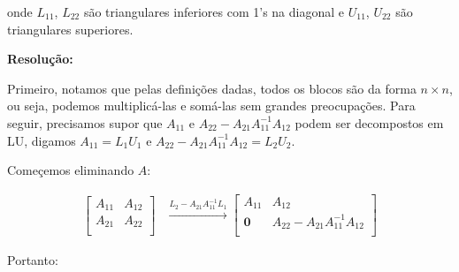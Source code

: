 \documentclass[leqno]{article}
\begin{document}
\begin{enumerate}
    onde $L_{11}$, $L_{22}$ são triangulares inferiores com 1's na diagonal e $U_{11}$, $U_{22}$ são triangulares superiores.
    
    \textbf{Resolução:}
    
    Primeiro, notamos que pelas definições dadas, todos os blocos são da forma $n\times n$, ou seja, podemos multiplicá-las e somá-las sem grandes preocupações. Para seguir, precisamos supor que $A_{11}$ e $A_{22}-A_{21}A_{11}^{-1}A_{12}$ podem ser decompostos em LU, digamos $A_{11}=L_1U_1$ e $A_{22}-A_{21}A_{11}^{-1}A_{12}=L_2U_2$.
    
    Começemos eliminando $A$:
    
    \begin{align*}
        \begin{bmatrix}
        A_{11} & A_{12}\\
        A_{21} & A_{22}\\
        \end{bmatrix}&\xrightarrow{L_2-A_{21}A_{11}^{-1}L_1}\begin{bmatrix}
        A_{11} & A_{12}\\
        \textbf{0} & A_{22}-A_{21}A_{11}^{-1}A_{12}\\
        \end{bmatrix}
    \end{align*}
    
    Portanto:
    

\end{enumerate}
\end{document}
